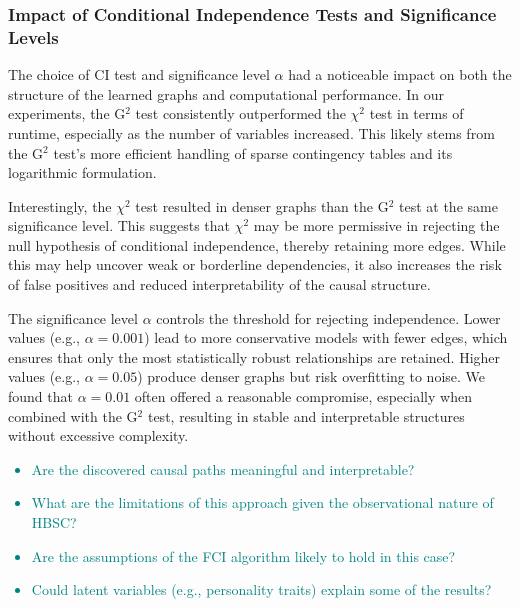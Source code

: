 \documentclass[main.tex]{subfiles}
\begin{document}
\subsubsection*{Impact of Conditional Independence Tests and Significance Levels}
The choice of CI test and significance level $\alpha$ had a noticeable impact on both the structure of the learned graphs and computational performance. In our experiments, the G$^2$ test consistently outperformed the $\chi^2$ test in terms of runtime, especially as the number of variables increased. This likely stems from the G$^2$ test's more efficient handling of sparse contingency tables and its logarithmic formulation.

Interestingly, the $\chi^2$ test resulted in denser graphs than the G$^2$ test at the same significance level. This suggests that $\chi^2$ may be more permissive in rejecting the null hypothesis of conditional independence, thereby retaining more edges. While this may help uncover weak or borderline dependencies, it also increases the risk of false positives and reduced interpretability of the causal structure.

The significance level $\alpha$ controls the threshold for rejecting independence. Lower values (e.g., $\alpha = 0.001$) lead to more conservative models with fewer edges, which ensures that only the most statistically robust relationships are retained. Higher values (e.g., $\alpha = 0.05$) produce denser graphs but risk overfitting to noise. We found that $\alpha = 0.01$ often offered a reasonable compromise, especially when combined with the G$^2$ test, resulting in stable and interpretable structures without excessive complexity.

\textcolor{teal}{
\begin{itemize}
    \item Are the discovered causal paths meaningful and interpretable?
    \item What are the limitations of this approach given the observational nature of HBSC?
    \item Are the assumptions of the FCI algorithm likely to hold in this case?
    \item Could latent variables (e.g., personality traits) explain some of the results?
\end{itemize}}
\end{document}
